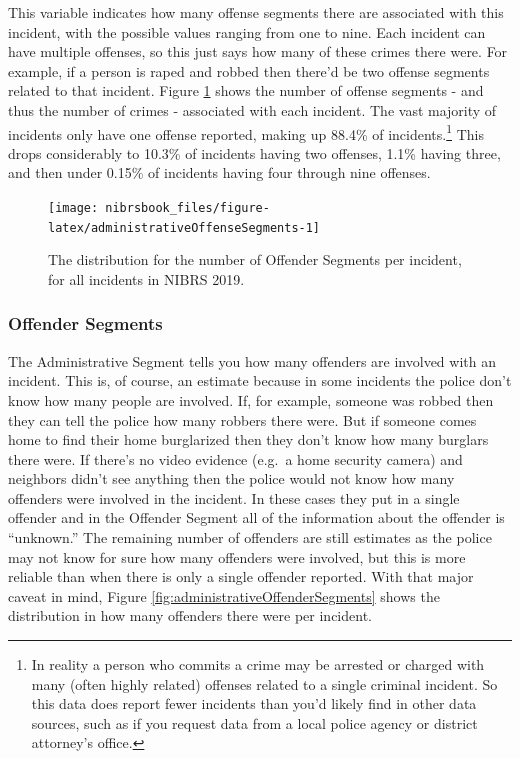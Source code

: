 \documentclass[
  12pt,
  openany]{book}
\begin{document}
This variable indicates how many offense segments there are associated with this incident, with the possible values ranging from one to nine. Each incident can have multiple offenses, so this just says how many of these crimes there were. For example, if a person is raped and robbed then there'd be two offense segments related to that incident. Figure \ref{fig:administrativeOffenseSegments} shows the number of offense segments - and thus the number of crimes - associated with each incident. The vast majority of incidents only have one offense reported, making up 88.4\% of incidents.\footnote{In reality a person who commits a crime may be arrested or charged with many (often highly related) offenses related to a single criminal incident. So this data does report fewer incidents than you'd likely find in other data sources, such as if you request data from a local police agency or district attorney's office.} This drops considerably to 10.3\% of incidents having two offenses, 1.1\% having three, and then under 0.15\% of incidents having four through nine offenses.

\begin{figure}

{\centering \texttt{[image: nibrsbook\_files/figure-latex/administrativeOffenseSegments-1]} 

}

\caption{The distribution for the number of Offender Segments per incident, for all incidents in NIBRS 2019.}\label{fig:administrativeOffenseSegments}
\end{figure}

\hypertarget{offender-segments}{%
\subsubsection{Offender Segments}\label{offender-segments}}

The Administrative Segment tells you how many offenders are involved with an incident. This is, of course, an estimate because in some incidents the police don't know how many people are involved. If, for example, someone was robbed then they can tell the police how many robbers there were. But if someone comes home to find their home burglarized then they don't know how many burglars there were. If there's no video evidence (e.g.~a home security camera) and neighbors didn't see anything then the police would not know how many offenders were involved in the incident. In these cases they put in a single offender and in the Offender Segment all of the information about the offender is ``unknown.'' The remaining number of offenders are still estimates as the police may not know for sure how many offenders were involved, but this is more reliable than when there is only a single offender reported. With that major caveat in mind, Figure \ref{fig:administrativeOffenderSegments} shows the distribution in how many offenders there were per incident.
\end{document}
